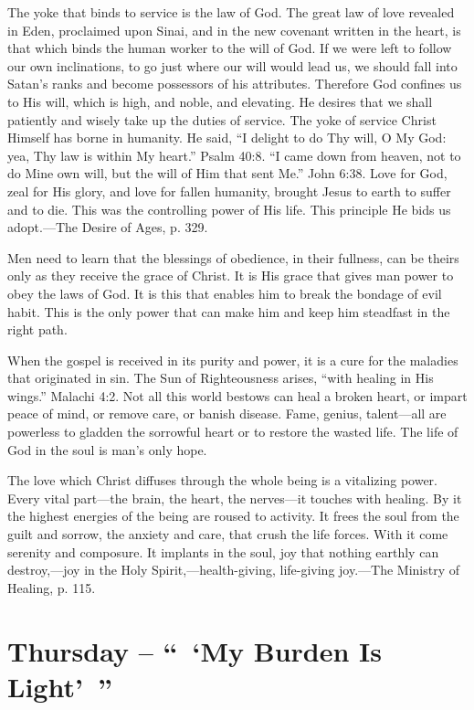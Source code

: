 \documentclass[a4paper, 10pt, twoside, headings=small]{scrartcl}
\begin{document}
\begin{multicols}{2}
The yoke that binds to service is the law of God. The great law of love revealed in Eden, proclaimed upon Sinai, and in the new covenant written in the heart, is that which binds the human worker to the will of God. If we were left to follow our own inclinations, to go just where our will would lead us, we should fall into Satan’s ranks and become possessors of his attributes. Therefore God confines us to His will, which is high, and noble, and elevating. He desires that we shall patiently and wisely take up the duties of service. The yoke of service Christ Himself has borne in humanity. He said, “I delight to do Thy will, O My God: yea, Thy law is within My heart.” Psalm 40:8. “I came down from heaven, not to do Mine own will, but the will of Him that sent Me.” John 6:38. Love for God, zeal for His glory, and love for fallen humanity, brought Jesus to earth to suffer and to die. This was the controlling power of His life. This principle He bids us adopt.—The Desire of Ages, p. 329.

Men need to learn that the blessings of obedience, in their fullness, can be theirs only as they receive the grace of Christ. It is His grace that gives man power to obey the laws of God. It is this that enables him to break the bondage of evil habit. This is the only power that can make him and keep him steadfast in the right path.

When the gospel is received in its purity and power, it is a cure for the maladies that originated in sin. The Sun of Righteousness arises, “with healing in His wings.” Malachi 4:2. Not all this world bestows can heal a broken heart, or impart peace of mind, or remove care, or banish disease. Fame, genius, talent—all are powerless to gladden the sorrowful heart or to restore the wasted life. The life of God in the soul is man’s only hope.

The love which Christ diffuses through the whole being is a vitalizing power. Every vital part—the brain, the heart, the nerves—it touches with healing. By it the highest energies of the being are roused to activity. It frees the soul from the guilt and sorrow, the anxiety and care, that crush the life forces. With it come serenity and composure. It implants in the soul, joy that nothing earthly can destroy,—joy in the Holy Spirit,—health-giving, life-giving joy.—The Ministry of Healing, p. 115.

\section*{Thursday – “ ‘My Burden Is Light’ ”}


\end{multicols}
\end{document}

